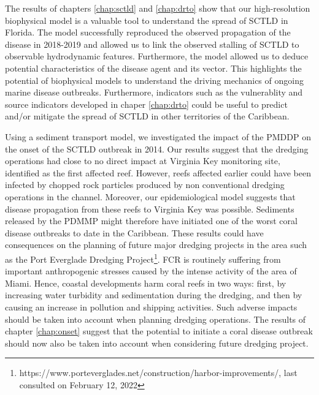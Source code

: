 The results of chapters \ref{chap:sctld} and \ref{chap:drto} show that our high-resolution biophysical model is a valuable tool to understand the spread of SCTLD in Florida. The model successfully reproduced the observed propagation of the disease in 2018-2019 and allowed us to link the observed stalling of SCTLD to observable hydrodynamic features. Furthermore, the model allowed us to deduce potential characteristics of the disease agent and its vector. This highlights the potential of biophysical models to understand the driving mechanics of ongoing marine disease outbreaks. Furthermore, indicators such as the vulnerablity and source indicators developed in chaper \ref{chap:drto} could be useful to predict and/or mitigate the spread of SCTLD in other territories of the Caribbean.

Using a sediment transport model, we investigated the impact of the PMDDP on the onset of the SCTLD outbreak in 2014. Our results suggest that the dredging operations had close to no direct impact at Virginia Key monitoring site, identified as the first affected reef. However, reefs affected earlier could have been infected by chopped rock particles produced by non conventional dredging operations in the channel. Moreover, our epidemiological model suggests that disease propagation from these reefs to Virginia Key was possible. Sediments released by the PDMMP might therefore have initiated one of the worst coral disease outbreaks to date in the Caribbean. These results could have consequences on the planning of future major dredging projects in the area such as the Port Everglade Dredging Project\footnote{https://www.porteverglades.net/construction/harbor-improvements/, last consulted on February 12, 2022}. FCR is routinely suffering from important anthropogenic stresses caused by the intense activity of the area of Miami. Hence, coastal developments harm coral reefs in two ways: first, by increasing water turbidity and sedimentation during the dredging, and then by causing an increase in pollution and shipping activities. Such adverse impacts should be taken into account when planning dredging operations. The results of chapter \ref{chap:onset} suggest that the potential to initiate a coral disease outbreak should now also be taken into account when considering future dredging project.

